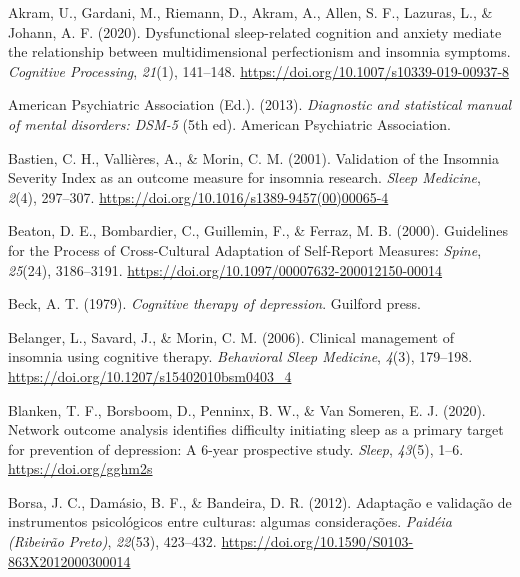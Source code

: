 \documentclass[
  ,doc,11pt, twoside,floatsintext]{apa6}
\newlength{\cslhangindent}
\newlength{\cslentryspacingunit} %
\newenvironment{CSLReferences}[2] %
 {%
  \setlength{\parindent}{0pt}
  \ifodd #1
  \let\oldpar\par
  \def\par{\hangindent=\cslhangindent\oldpar}
  \fi
  \setlength{\parskip}{#2\cslentryspacingunit}
 }%
 {}
\begin{document}
\setlength{\parindent}{-0.5in}
\setlength{\leftskip}{0.5in}

\hypertarget{refs}{}
\begin{CSLReferences}{1}{0}
\leavevmode{}%
Akram, U., Gardani, M., Riemann, D., Akram, A., Allen, S. F., Lazuras, L., \& Johann, A. F. (2020). Dysfunctional sleep-related cognition and anxiety mediate the relationship between multidimensional perfectionism and insomnia symptoms. \emph{Cognitive Processing}, \emph{21}(1), 141--148. \url{https://doi.org/10.1007/s10339-019-00937-8}

\leavevmode{}%
American Psychiatric Association (Ed.). (2013). \emph{Diagnostic and statistical manual of mental disorders: {DSM}-5} (5th ed). {American Psychiatric Association}.

\leavevmode{}%
Bastien, C. H., Vallières, A., \& Morin, C. M. (2001). Validation of the {Insomnia Severity Index} as an outcome measure for insomnia research. \emph{Sleep Medicine}, \emph{2}(4), 297--307. \url{https://doi.org/10.1016/s1389-9457(00)00065-4}

\leavevmode{}%
Beaton, D. E., Bombardier, C., Guillemin, F., \& Ferraz, M. B. (2000). Guidelines for the {Process} of {Cross-Cultural Adaptation} of {Self-Report Measures}: \emph{Spine}, \emph{25}(24), 3186--3191. \url{https://doi.org/10.1097/00007632-200012150-00014}

\leavevmode{}%
Beck, A. T. (1979). \emph{Cognitive therapy of depression}. Guilford press.

\leavevmode{}%
Belanger, L., Savard, J., \& Morin, C. M. (2006). Clinical management of insomnia using cognitive therapy. \emph{Behavioral Sleep Medicine}, \emph{4}(3), 179--198. \url{https://doi.org/10.1207/s15402010bsm0403_4}

\leavevmode{}%
Blanken, T. F., Borsboom, D., Penninx, B. W., \& Van Someren, E. J. (2020). Network outcome analysis identifies difficulty initiating sleep as a primary target for prevention of depression: A 6-year prospective study. \emph{Sleep}, \emph{43}(5), 1--6. \url{https://doi.org/gghm2s}

\leavevmode{}%
Borsa, J. C., Damásio, B. F., \& Bandeira, D. R. (2012). {Adaptação e validação de instrumentos psicológicos entre culturas: algumas considerações}. \emph{Paidéia (Ribeirão Preto)}, \emph{22}(53), 423--432. \url{https://doi.org/10.1590/S0103-863X2012000300014}


\end{CSLReferences}
\end{document}
